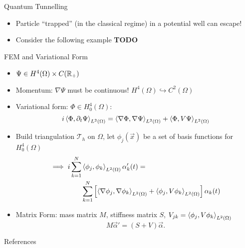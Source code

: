 \documentclass{beamer}
\begin{document}
\begin{frame}{Quantum Tunnelling}
  \begin{itemize}
	\item Particle ``trapped'' (in the classical regime) in a potential
			well can escape!
	\item Consider the following example \textbf{TODO}
  \end{itemize}
\end{frame}

\begin{frame}{FEM and Variational Form}
  \begin{itemize}
	\item $\Psi \in H^4(\Omega) \times C(\mathbb{R}_+)$
	\item Momentum: $\nabla \Psi$ must be continuous! 
			$H^4(\Omega) \hookrightarrow C^2(\Omega)$
	\item Variational form: $\Phi \in H^4_0(\Omega)$:
			\[
					i \left\langle \Phi, \partial_t \Psi \right\rangle_{L^2(\Omega)} = 
					\left\langle \nabla \Phi, \nabla \Psi \right\rangle_{L^2(\Omega)} + 
					\left\langle \Phi, V \Psi \right\rangle_{L^2(\Omega)}
			\] 
		\item Build triangulation $\mathcal T_h$ on $\Omega$, let 
			$\phi_j(\vec x)$ be a set of basis functions for $H^4_0(\Omega)$
			\[\begin{split}
					\implies i \sum_{k=1}^N 
					& \left\langle \phi_j, \phi_k \right\rangle_{L^2(\Omega)} \alpha_k'(t) = \\
					& \sum_{k=1}^N \left[
							\left\langle \nabla \phi_j, \nabla \phi_k \right\rangle_{L^2(\Omega)}
					+ \left\langle \phi_j, V \phi_k \right\rangle_{L^2(\Omega)}\right] 
					\alpha_k(t)
			\end{split}\] 
	\item Matrix Form: mass matrix $M$, stiffness matrix $S$, 
			$V_{jk} = \left\langle \phi_j, V \phi_k \right\rangle_{L^2(\Omega)}$
			\[
					M \vec \alpha' = (S + V) \vec \alpha
			.\] 
  \end{itemize}
\end{frame}
\begin{frame}{References}
		
		
		\nocite{*}
\end{frame}
\end{document}
